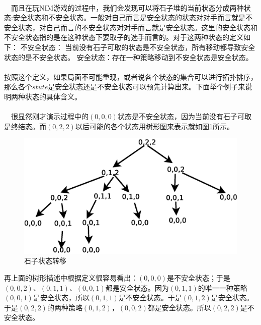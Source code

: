 \documentclass[UTF8,nofonts,cs4size]{ctexrep}
\begin{document}
\paragraph*{}
\indent
\ \ 而且在玩NIM游戏的过程中，我们会发现可以将石子堆的当前状态分成两种状态:安全状态和不安全状态。一般对自己而言是安全状态的状态对对手而言就是不安全状态，对自己而言的不安全状态对对手而言就是安全状态。这里的安全状态和不安全状态指的是在这种状态下要取子的选手而言的。对于这两种状态的定义如下：
\newline
\indent
不安全状态： 当前没有石子可取的状态是不安全状态，所有移动都导致安全状态的是不安全状态。
\newline
\indent
安全状态：存在一种策略移动到不安全状态是安全状态。
\paragraph*{}
按照这个定义，如果局面不可能重现，或者说各个状态的集合可以进行拓扑排序，那么各个$stute$是安全状态还是不安全状态可以预先计算出来。下面举个例子来说明两种状态的具体含义。
\paragraph*{}
\indent
\ \ 很显然刚才演示过程中的$(0,0,0)$状态是不安全状态，因为当前没有石子可取是终结态。而$(0,2,2)$以后可能的各个状态用树形图来表示就如图\ref{change}所示。
\begin{figure}[ht]
\begin{center}
\includegraphics[scale=0.42]{dd.eps}
\end{center}
\caption{石子状态转移}
\label{change}
\end{figure}

再上面的树形描述中根据定义很容易看出：$(0,0,0)$是不安全状态；于是$(0,0,2)$、$(0,1,1)、(0,0,1)$都是安全状态。因为$(0,1,1)$的唯一一种策略$(0,0,1)$是安全状态，所以$(0,1,1)$是不安全状态。于是$(0,1,2)$是安全状态。于是$(0,2,2)$的两种策略$(0,1,2)$，$(0,0,2)$都是安全状态。所以$(0,2,2)$是不安全状态。
\end{document}
